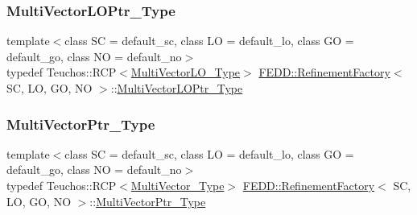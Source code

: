\mbox{\label{classFEDD_1_1RefinementFactory_a002c7179ca2f22db4505da2db0f798e9}} 
\subsubsection{\texorpdfstring{Multi\+Vector\+L\+O\+Ptr\+\_\+\+Type}{MultiVectorLOPtr\_Type}}
{\footnotesize\ttfamily template$<$class SC = default\+\_\+sc, class LO = default\+\_\+lo, class GO = default\+\_\+go, class NO = default\+\_\+no$>$ \\
typedef Teuchos\+::\+R\+CP$<$\hyperlink{classFEDD_1_1RefinementFactory_ae731f05f6a28d13f917230f914f29037}{Multi\+Vector\+L\+O\+\_\+\+Type}$>$ \hyperlink{classFEDD_1_1RefinementFactory}{F\+E\+D\+D\+::\+Refinement\+Factory}$<$ SC, LO, GO, NO $>$\+::\hyperlink{classFEDD_1_1RefinementFactory_a002c7179ca2f22db4505da2db0f798e9}{Multi\+Vector\+L\+O\+Ptr\+\_\+\+Type}}

\mbox{\label{classFEDD_1_1RefinementFactory_a0592bb145b1f5b1daac2e69a96c23cb5}} 
\subsubsection{\texorpdfstring{Multi\+Vector\+Ptr\+\_\+\+Type}{MultiVectorPtr\_Type}}
{\footnotesize\ttfamily template$<$class SC = default\+\_\+sc, class LO = default\+\_\+lo, class GO = default\+\_\+go, class NO = default\+\_\+no$>$ \\
typedef Teuchos\+::\+R\+CP$<$\hyperlink{classFEDD_1_1RefinementFactory_af7c4cb285d95e61820d63b9344a90976}{Multi\+Vector\+\_\+\+Type}$>$ \hyperlink{classFEDD_1_1RefinementFactory}{F\+E\+D\+D\+::\+Refinement\+Factory}$<$ SC, LO, GO, NO $>$\+::\hyperlink{classFEDD_1_1RefinementFactory_a0592bb145b1f5b1daac2e69a96c23cb5}{Multi\+Vector\+Ptr\+\_\+\+Type}}

